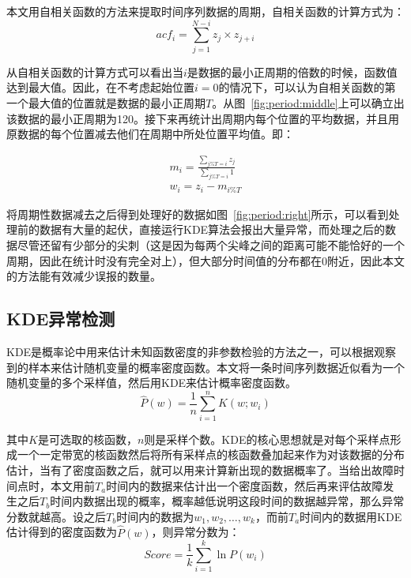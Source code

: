 本文用自相关函数的方法来提取时间序列数据的周期\cite{rabiner1977use}，自相关函数的计算方式为：
\begin{equation*}
  acf_i = \sum_{j=1}^{N-i}z_j\times z_{j+i}
\end{equation*}

从自相关函数的计算方式可以看出当$i$是数据的最小正周期的倍数的时候，函数值达到最大值。因此，在不考虑起始位置$i=0$的情况下，可以认为自相关函数的第一个最大值的位置就是数据的最小正周期$T$。从图~\ref{fig:period:middle}上可以确立出该数据的最小正周期为120。接下来再统计出周期内每个位置的平均数据，并且用原数据的每个位置减去他们在周期中所处位置平均值。即：

\begin{equation*}
  \begin{aligned}
  m_i = \frac{\sum_{j\%T = i}z_j}{\sum_{j\%T = i}1}\\
  w_i = z_i - m_{i\%T}
  \end{aligned}
\end{equation*}

将周期性数据减去之后得到处理好的数据如图~\ref{fig:period:right}所示，可以看到处理前的数据有大量的起伏，直接运行KDE算法会报出大量异常，而处理之后的数据尽管还留有少部分的尖刺（这是因为每两个尖峰之间的距离可能不能恰好的一个周期，因此在统计时没有完全对上），但大部分时间值的分布都在0附近，因此本文的方法能有效减少误报的数量。

\subsection{KDE异常检测}
KDE是概率论中用来估计未知函数密度的非参数检验的方法之一，可以根据观察到的样本来估计随机变量的概率密度函数。本文将一条时间序列数据近似看为一个随机变量的多个采样值，然后用KDE来估计概率密度函数。
\begin{equation*}
\hat{P}(w) = \frac{1}{n}\sum_{i=1}^nK(w;w_i)
\end{equation*}

其中$K$是可选取的核函数，$n$则是采样个数。KDE的核心思想就是对每个采样点形成一个一定带宽的核函数然后将所有采样点的核函数叠加起来作为对该数据的分布估计，当有了密度函数之后，就可以用来计算新出现的数据概率了。当给出故障时间点时，本文用前$T_a$时间内的数据来估计出一个密度函数，然后再来评估故障发生之后$T_b$时间内数据出现的概率，概率越低说明这段时间的数据越异常，那么异常分数就越高。设之后$T_b$时间内的数据为$w_1,w_2,\dots,w_k$，而前$T_a$时间内的数据用KDE估计得到的密度函数为$\hat{P}(w)$，则异常分数为：
\begin{equation*}
  Score = \frac{1}{k}\sum_{i=1}^k\ln P(w_i)
\end{equation*}

